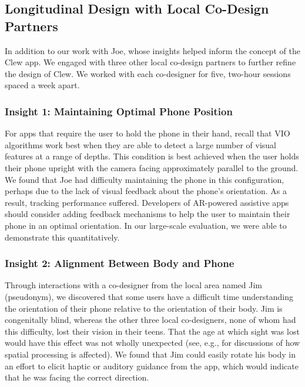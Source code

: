 \documentclass[chi_draft]{sigchi}
\begin{document}
\subsection{Longitudinal Design with Local Co-Design Partners}
In addition to our work with Joe, whose insights helped inform the concept of the Clew app.  We engaged with three other local co-design partners to further refine the design of Clew.  We worked with each co-designer for five, two-hour sessions spaced a week apart.

\subsubsection{Insight 1: Maintaining Optimal Phone Position}
For apps that require the user to hold the phone in their hand, recall that VIO algorithms work best when they are able to detect a large number of visual features at a range of depths.  This condition is best achieved when the user holds their phone upright with the camera facing approximately parallel to the ground.  We found that Joe had difficulty maintaining the phone in this configuration, perhaps due to the lack of visual feedback about the phone's orientation.  As a result, tracking performance suffered.  Developers of AR-powered assistive apps should consider adding feedback mechanisms to help the user to maintain their phone in an optimal orientation.  In our large-scale evaluation, we were able to demonstrate this quantitatively.

\subsubsection{Insight 2: Alignment Between Body and Phone}
Through interactions with a co-designer from the local area named Jim (pseudonym), we discovered that some users have a difficult time understanding the orientation of their phone relative to the orientation of their body.  Jim is congenitally blind, whereas the other three local co-designers, none of whom had this difficulty, lost their vision in their teens.  That the age at which sight was lost would have this effect was not wholly unexpected (see, e.g., \cite{long1997establishing, wiener2010foundations, schinazi2016spatial, thinus1997representation, williams2014just} for discussions of how spatial processing is affected).  We found that Jim could easily rotate his body in an effort to elicit haptic or auditory guidance from the app, which would indicate that he was facing the correct direction.
\end{document}
